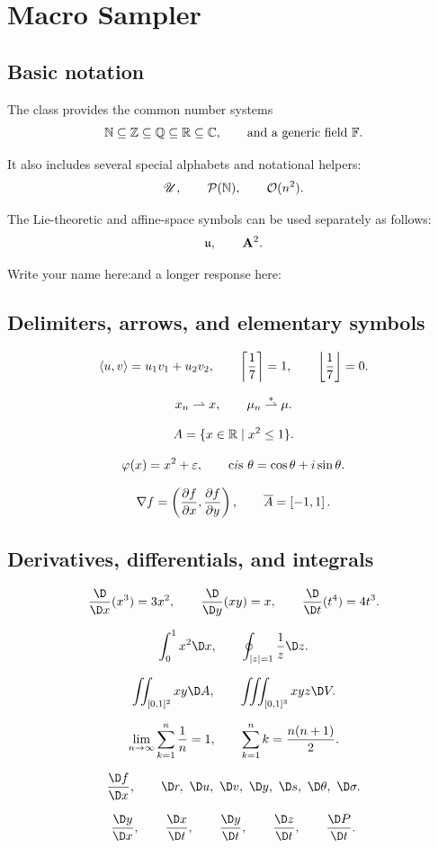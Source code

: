 \chapter{Macro Sampler}

\section{Basic notation}
The class provides the common number systems
\[
\N\subseteq \Z\subseteq \Q\subseteq \R\subseteq \C,
\qquad
\text{and a generic field } \F.
\]

It also includes several special alphabets and notational helpers:
\[
\U,
\qquad
\P(\N),
\qquad
\O(n^2).
\]

The Lie-theoretic and affine-space symbols can be used separately as follows:
\[
\u,
\qquad
\A^2.
\]

Write your name here:\blank\quad and a longer response here: \blankfill

\section{Delimiters, arrows, and elementary symbols}
\[
\la u,v \ra = u_1v_1+u_2v_2,
\qquad
\ceil*{\vf{7}} = 1,
\qquad
\floor*{\vf{7}} = 0.
\]

\[
x_n \rh x,
\qquad
\mu_n \xrh \mu.
\]

\[
A = \{x\in\R \suchthat x^2\le 1\}.
\]

\[
\phi(x)=x^2+\epsilon,
\qquad
\cis \theta = \cos\theta + i\sin\theta.
\]

\[
\grad f = \left(\frac{\d f}{\d x},\frac{\d f}{\d y}\right),
\qquad
\bar{A}=\left[-1,1\right].
\]

\section{Derivatives, differentials, and integrals}
\[
\ddx(x^3)=3x^2,
\qquad
\ddy(xy)=x,
\qquad
\ddt(t^4)=4t^3.
\]

\[
\dint_0^1 x^2\dx,
\qquad
\doint_{|z|=1} \frac{1}{z}\dz.
\]

\[
\diint_{[0,1]^2} xy\dA,
\qquad
\diiint_{[0,1]^3} xyz\dV.
\]

\[
\dlim_{n\to\infty}\sum_{k=1}^{n}\vf{n} = 1,
\qquad
\dsum_{k=1}^{n} k = \frac{n(n+1)}{2}.
\]

\[
\frac{\df}{\dx},
\qquad
\dr,\ \du,\ \dv,\ \dy,\ \ds,\ \dtheta,\ \dsigma.
\]

\[
\dydx,
\qquad
\dxdt,
\qquad
\dydt,
\qquad
\dzdt,
\qquad
\dPdt.
\]

